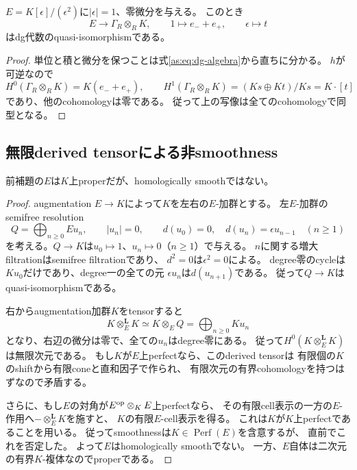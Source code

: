 \begin{lemma}\label{as:lem:generic}
$E=K[\epsilon]/(\epsilon^2)$に$|\epsilon|=1$、零微分を与える。
このとき
\[
 E\longrightarrow\Gamma_R\otimes_R K,\qquad
 1\longmapsto e_-+e_+,\qquad \epsilon\longmapsto t
\]
はdg代数のquasi-isomorphismである。
\end{lemma}
\begin{proof}
単位と積と微分を保つことは式\eqref{as:eq:dg-algebra}から直ちに分かる。
$h$が可逆なので
\[
 H^0(\Gamma_R\otimes_R K)=K(e_-+e_+),\qquad
 H^1(\Gamma_R\otimes_R K)=(Ks\oplus Kt)/Ks=K\cdot[t]
\]
であり、他のcohomologyは零である。
従って上の写像は全てのcohomologyで同型となる。
\end{proof}

\subsection{無限derived tensorによる非smoothness}

\begin{lemma}[degree一の外積代数はsmoothでない]
\label{as:lem:exterior-not-smooth}
前補題の$E$は$K$上properだが、homologically smoothではない。
\end{lemma}
\begin{proof}
augmentation $E\to K$によって$K$を左右の$E$-加群とする。
左$E$-加群のsemifree resolution
\[
 Q=\bigoplus_{n\ge0}Eu_n,\qquad |u_n|=0,\qquad
 d(u_0)=0,\quad d(u_n)=\epsilon u_{n-1}\quad(n\ge1)
\]
を考える。$Q\to K$は$u_0\mapsto1$、$u_n\mapsto0$（$n\ge1$）で与える。
$n$に関する増大filtrationはsemifree filtrationであり、
$d^2=0$は$\epsilon^2=0$による。
degree零のcycleは$Ku_0$だけであり、degree一の全ての元
$\epsilon u_n$は$d(u_{n+1})$である。
従って$Q\to K$はquasi-isomorphismである。

右からaugmentation加群$K$をtensorすると
\[
 K\otimes_E^{\mathbf L}K
 \simeq K\otimes_E Q
 =\bigoplus_{n\ge0}Ku_n
\]
となり、右辺の微分は零で、全ての$u_n$はdegree零にある。
従って$H^0(K\otimes_E^{\mathbf L}K)$は無限次元である。
もし$K$が$E$上perfectなら、このderived tensorは
有限個の$K$のshiftから有限coneと直和因子で作られ、
有限次元の有界cohomologyを持つはずなので矛盾する。

さらに、もし$E$の対角が$E^{\rm op}\otimes_KE$上perfectなら、
その有限cell表示の一方の$E$-作用へ$-\otimes_E^{\mathbf L}K$を施すと、
$K$の有限$E$-cell表示を得る。
これは$K$が$K$上perfectであることを用いる。
従ってsmoothnessは$K\in\operatorname{Perf}(E)$を含意するが、
直前でこれを否定した。
よって$E$はhomologically smoothでない。
一方、$E$自体は二次元の有界$K$-複体なのでproperである。
\end{proof}

